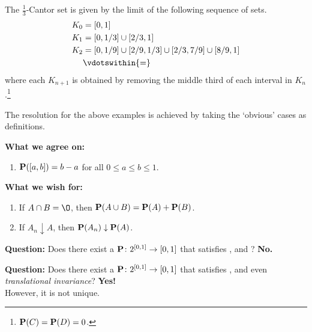\begin{examples}
    The $\frac13$-Cantor set is given by the limit of the following
    sequence of sets. \begin{align*}
        K_0 &= [0, 1] \\
        K_1 &= [0, 1/3] \cup [2/3, 1] \\
        K_2 &= [0, 1/9] \cup [2/9, 1/3] \cup [2/3, 7/9] \cup [8/9, 1] \\
        &\vdotswithin{=}
    \end{align*}
    where each $K_{n+1}$ is obtained by removing the middle third of each
    interval in $K_n$.\footnote{$\P(C) = \P(D) = 0$.}
\end{examples}

The resolution for the above examples is achieved by taking the `obvious'
cases as definitions.\\[2ex]
\begin{minipage}{0.4\textwidth}
    \textbf{What we agree on:}
    \begin{enumerate}[($*$)]
        \item $\P([a, b]) = b - a$ for all $0 \le a \le b \le 1$.
            \label{def:discrete:interval}
    \end{enumerate}
\end{minipage}%
\qquad%
\begin{minipage}{0.5\textwidth}
    \textbf{What we wish for:}
    \begin{enumerate}[({\small\#}1)]
        \item If $A \cap B = \O$, then
            $\P(A \cup B) = \P(A) + \P(B)$.
            \makeatletter \def\@currentlabel{($*$)} \makeatother
            \label{def:discrete:disjoint}
        \item If $A_n \downarrow A$, then
            $\P(A_n) \downarrow \P(A)$.
            \label{def:discrete:decreasing}
    \end{enumerate}
\end{minipage}

\vspace{1em}%
\textbf{Question:} Does there exist a $\P\colon 2^{[0, 1]} \to [0, 1]$
that satisfies ,
 and ?
\textbf{No.}

\textbf{Question:} Does there exist a $\P\colon 2^{[0, 1]} \to [0, 1]$
that satisfies ,
 and even \emph{translational invariance}?
\textbf{Yes!} \\
However, it is not unique.


